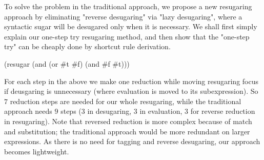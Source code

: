To solve the problem in the traditional approach, we propose a new resugaring approach by eliminating "reverse desugaring" via "lazy desugaring", where a syntactic sugar will be desugared only when it is necessary. We shall first simply explain our one-step try resugaring method, and then show that the "one-step try" can be cheaply done by shortcut rule derivation.

\begin{Codes}
    (resugar (and (or \#t \#f) (and \#f \#t)))
 
 
\end{Codes}

For each step in the above we make one reduction while moving resugaring focus if  deusgaring is unnecessary (where evaluation is moved to its subexpression). So $7$ reduction steps are needed for our whole resugaring, while the traditional approach needs $9$ steps ($3$ in desugaring, $3$ in evaluation, $3$ for reverse reduction in resugaring). Note that reversed reduction is more complex because of match and substitution; the traditional approach would be more redundant on larger expressions. As there is no need for tagging and reverse desugaring, our approach becomes lightweight.

